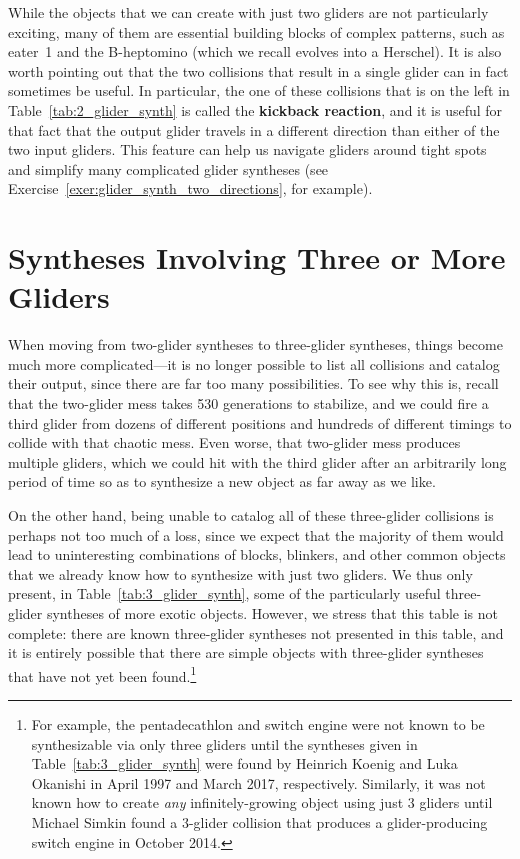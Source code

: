 While the objects that we can create with just two gliders are not particularly exciting, many of them are essential building blocks of complex patterns, such as eater~1 and the B-heptomino (which we recall evolves into a Herschel). It is also worth pointing out that the two collisions that result in a single glider can in fact sometimes be useful. In particular, the one of these collisions that is on the left in Table~\ref{tab:2_glider_synth} is called the \textbf{kickback reaction}, and it is useful for that fact that the output glider travels in a different direction than either of the two input gliders. This feature can help us navigate gliders around tight spots and simplify many complicated glider syntheses (see Exercise~\ref{exer:glider_synth_two_directions}, for example).


\section{Syntheses Involving Three or More Gliders}\label{sec:3glidersynth}

When moving from two-glider syntheses to three-glider syntheses, things become much more complicated---it is no longer possible to list all collisions and catalog their output, since there are far too many possibilities. To see why this is, recall that the two-glider mess takes 530 generations to stabilize, and we could fire a third glider from dozens of different positions and hundreds of different timings to collide with that chaotic mess. Even worse, that two-glider mess produces multiple gliders, which we could hit with the third glider after an arbitrarily long period of time so as to synthesize a new object as far away as we like.

On the other hand, being unable to catalog all of these three-glider collisions is perhaps not too much of a loss, since we expect that the majority of them would lead to uninteresting combinations of blocks, blinkers, and other common objects that we already know how to synthesize with just two gliders. We thus only present, in Table~\ref{tab:3_glider_synth}, some of the particularly useful three-glider syntheses of more exotic objects. However, we stress that this table is not complete: there are known three-glider syntheses not presented in this table, and it is entirely possible that there are simple objects with three-glider syntheses that have not yet been found.\footnote{For example, the pentadecathlon and switch engine were not known to be synthesizable via only three gliders until the syntheses given in Table~\ref{tab:3_glider_synth} were found by Heinrich Koenig and Luka Okanishi in April 1997 and March 2017, respectively. Similarly, it was not known how to create \emph{any} infinitely-growing object using just $3$ gliders until Michael Simkin found a $3$-glider collision that produces a glider-producing switch engine in October 2014.}

